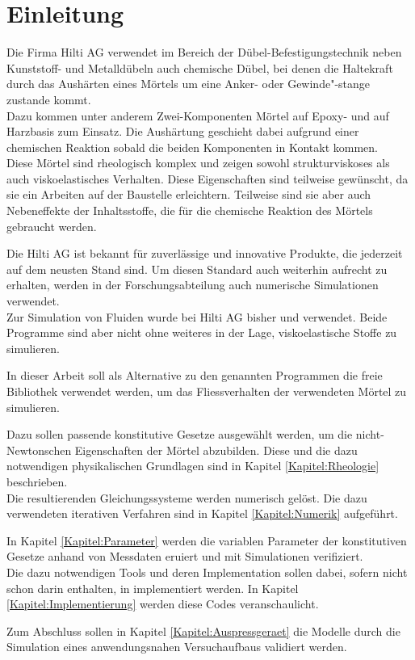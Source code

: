 \section{Einleitung}
\label{Kapitel:Einleitung}
Die Firma Hilti AG verwendet im Bereich der Dübel-Befestigungstechnik neben Kunststoff- und Metalldübeln auch chemische Dübel, bei denen die Haltekraft durch das Aushärten eines Mörtels um eine Anker- oder Gewinde"-stange zustande kommt. \\
Dazu kommen unter anderem Zwei-Komponenten Mörtel auf Epoxy- und auf Harzbasis zum Einsatz. Die Aushärtung geschieht dabei aufgrund einer chemischen Reaktion sobald die beiden Komponenten in Kontakt kommen.\\
Diese Mörtel sind rheologisch komplex und zeigen sowohl strukturviskoses als auch viskoelastisches Verhalten. Diese Eigenschaften sind teilweise gewünscht, da sie ein Arbeiten auf der Baustelle erleichtern. Teilweise sind sie aber auch Nebeneffekte der Inhaltsstoffe, die für die chemische Reaktion des Mörtels gebraucht werden.

Die Hilti AG ist bekannt für zuverlässige und innovative Produkte, die jederzeit auf dem neusten Stand sind. Um diesen Standard auch weiterhin aufrecht zu erhalten, werden in der Forschungsabteilung auch numerische Simulationen verwendet.\\
Zur Simulation von Fluiden wurde bei Hilti AG bisher \comsol{} und \cfx{} verwendet. Beide Programme sind aber nicht ohne weiteres in der Lage, viskoelastische Stoffe zu simulieren.%

In dieser Arbeit soll als Alternative zu den genannten Programmen die freie Bibliothek \openfoam{} verwendet werden, um das Fliessverhalten der verwendeten Mörtel zu simulieren.

Dazu sollen passende konstitutive Gesetze ausgewählt werden, um die nicht-Newtonschen Eigenschaften der Mörtel abzubilden. Diese und die dazu notwendigen physikalischen Grundlagen sind in Kapitel \ref{Kapitel:Rheologie} beschrieben.\\
Die resultierenden Gleichungssysteme werden numerisch gelöst. Die dazu verwendeten iterativen Verfahren sind in Kapitel \ref{Kapitel:Numerik} aufgeführt.

In Kapitel \ref{Kapitel:Parameter} werden die variablen Parameter der konstitutiven Gesetze anhand von Messdaten eruiert und mit Simulationen verifiziert.\\
Die dazu notwendigen Tools und deren Implementation sollen dabei, sofern nicht schon darin enthalten, in \openfoam{} implementiert werden. In Kapitel \ref{Kapitel:Implementierung} werden diese Codes veranschaulicht.

Zum Abschluss sollen in Kapitel \ref{Kapitel:Auspressgeraet} die Modelle durch die Simulation eines anwendungsnahen Versuchaufbaus validiert werden.
